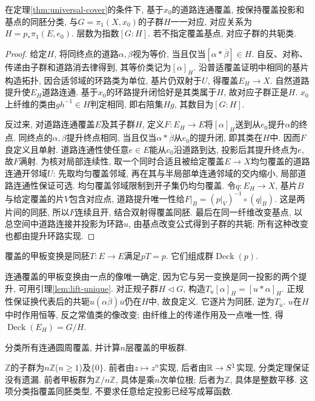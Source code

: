 \begin{theorem}\label{thm:cover-classification}
在定理\ref{thm:universal-cover}的条件下, 基于$x_0$的道路连通覆盖, 按保持覆盖投影和基点的同胚分类, 与$G=\pi_1(X,x_0)$的子群$H$一一对应, 对应关系为$H=p_*\pi_1(E,e_0)$. 层数为指数$[G:H]$. 若不指定覆盖基点, 对应子群的共轭类.
\end{theorem}
\begin{proof}
给定$H$, 将同终点的道路$\alpha,\beta$视为等价, 当且仅当$[\alpha*\overline\beta]\in H$. 自反、对称、传递由子群和道路消去律得到, 其等价类记为$[\alpha]_H$. 沿普适覆盖证明中相同的基片构造拓扑, 因合适邻域的环路类为单位, 基片仍双射于$U$, 得覆盖$E_H\to X$. 自然道路提升使$E_H$道路连通. 基于$x_0$的环路提升闭恰好是其类属于$H$, 故对应子群正是$H$. $x_0$上纤维的类由$g h^{-1}\in H$判定相同, 即右陪集$Hg$, 其数目为$[G:H]$.

反过来, 对道路连通覆盖$E$及其子群$H$, 定义$F:E_H\to E$将$[\alpha]_H$送到从$e_0$提升$\alpha$的终点. 同终点的$\alpha,\beta$提升终点相同, 当且仅当$\alpha*\overline\beta$从$e_0$的提升闭, 即其类在$H$中. 因而$F$良定义且单射. 道路连通性使任意$e\in E$能从$e_0$沿道路到达, 投影后其提升终点为$e$, 故$F$满射. 为核对局部连续性, 取一个同时合适且被给定覆盖$E\to X$均匀覆盖的道路连通开邻域$U$: 先取均匀覆盖邻域, 再在其与半局部单连通邻域的交内缩小, 局部道路连通性保证可选. 均匀覆盖邻域限制到开子集仍均匀覆盖. 令$q:E_H\to X$, 基片$B$与给定覆盖的片$V$包含对应点, 道路提升唯一性给$F|_B=(p|_V)^{-1}\circ(q|_B)$. 这是两片间的同胚, 所以$F$连续且开, 结合双射得覆盖同胚. 最后在同一纤维改变基点, 以总空间中道路连接并投影为环路$u$, 由基点改变公式得到子群的共轭; 所有这种改变也都由提升环路实现.
\end{proof}

\begin{definition}
覆盖的甲板变换是同胚$T:E\to E$满足$pT=p$. 它们组成群$\operatorname{Deck}(p)$.
\end{definition}
连通覆盖的甲板变换由一点的像唯一确定, 因为它与另一变换是同一投影的两个提升, 可用引理\ref{lem:lift-unique}. 对正规子群$H\triangleleft G$, 构造$T_u[\alpha]_H=[u*\alpha]_H$. 正规性保证换代表后的共轭$u(\alpha\overline\beta)\overline u$仍在$H$中, 故良定义. 它逐片为同胚, 逆为$T_{\overline u}$. $u$在$H$中时作用恒等, 反之常值类的像改变; 由纤维上的传递作用及一点唯一性, 得$\operatorname{Deck}(E_H)=G/H$.

\begin{example}
分类所有连通圆周覆盖, 并计算$n$层覆盖的甲板群.
\end{example}
\begin{solution}
$\mathbb Z$的子群为$n\mathbb Z$($n\ge1$)及$\{0\}$. 前者由$z\mapsto z^n$实现, 后者由$\mathbb R\to S^1$实现, 分类定理保证没有遗漏. 前者甲板群为$\mathbb Z/n\mathbb Z$, 具体是乘$n$次单位根; 后者为$\mathbb Z$, 具体是整数平移. 这项分类指覆盖同胚类型, 不要求任意给定投影已经写成幂函数.
\end{solution}

